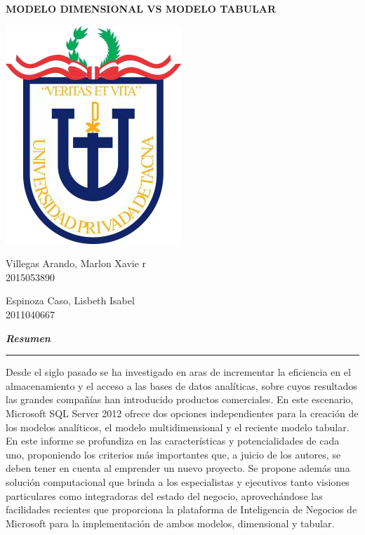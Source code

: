 \documentclass[11pt,a4paper]{article}
\begin{document}
	
	\begin{center}
		\huge \textbf{MODELO DIMENSIONAL VS MODELO TABULAR} 
	\end{center}
	\vspace{\baselineskip}
	\begin{center}
		\includegraphics[scale=0.37]{./IMAGENES/logo}
	\end{center}
	\begin{multicols}{2}

		\begin{center}
		    Villegas Arando, Marlon Xavie r\\            2015053890\\
			\columnbreak
			  
			Espinoza Caso, Lisbeth Isabel \\
			2011040667\\               
			
		\end{center}
		\normalsize			
	\end{multicols}
	\vspace{\baselineskip}
	\vspace{\baselineskip}
	
	\textbf{\textit{\large Resumen}}\rule[1.5mm]{5mm}{0.1mm}		
	Desde el siglo pasado se ha investigado en aras de incrementar la eficiencia en el almacenamiento y el acceso a las bases de datos analíticas, sobre cuyos resultados las grandes compañías han introducido productos comerciales. En este escenario, Microsoft SQL Server 2012 ofrece dos opciones independientes para la creación de los modelos analíticos, el modelo multidimensional y el reciente modelo tabular. En este informe se profundiza en las características y potencialidades de cada uno, proponiendo los criterios más importantes que, a juicio de los autores, se deben tener en cuenta al emprender un nuevo proyecto. Se propone además una solución computacional que brinda a los especialistas y ejecutivos tanto visiones particulares como integradoras del estado del negocio, aprovechándose las facilidades recientes que proporciona la plataforma de Inteligencia de Negocios de Microsoft para la implementación de ambos modelos, dimensional y tabular.\\
	
\end{document}
